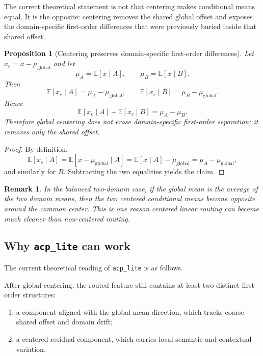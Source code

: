 \documentclass[11pt]{article}
\newtheorem{proposition}{Proposition}
\newtheorem{remark}{Remark}
\begin{document}
The correct theoretical statement is not that centering makes conditional means equal. It is the opposite: centering removes the shared global offset and exposes the domain-specific first-order differences that were previously buried inside that shared offset.

\begin{proposition}[Centering preserves domain-specific first-order differences]
Let $x_c = x - \mu_{\mathrm{global}}$ and let
\[
\mu_A = \mathbb{E}[x\mid A], \qquad \mu_B = \mathbb{E}[x\mid B].
\]
Then
\[
\mathbb{E}[x_c \mid A] = \mu_A - \mu_{\mathrm{global}},
\qquad
\mathbb{E}[x_c \mid B] = \mu_B - \mu_{\mathrm{global}}.
\]
Hence
\[
\mathbb{E}[x_c \mid A] - \mathbb{E}[x_c \mid B] = \mu_A - \mu_B.
\]
Therefore global centering does not erase domain-specific first-order separation; it removes only the shared offset.
\end{proposition}

\begin{proof}
By definition,
\[
\mathbb{E}[x_c \mid A]
=
\mathbb{E}[x-\mu_{\mathrm{global}}\mid A]
=
\mathbb{E}[x\mid A]-\mu_{\mathrm{global}}
=
\mu_A-\mu_{\mathrm{global}},
\]
and similarly for $B$. Subtracting the two equalities yields the claim.
\end{proof}

\begin{remark}
In the balanced two-domain case, if the global mean is the average of the two domain means, then the two centered conditional means become opposite around the common center. This is one reason centered linear routing can become much cleaner than non-centered routing.
\end{remark}

\subsection{Why \texttt{acp\_lite} can work}

The current theoretical reading of \texttt{acp\_lite} is as follows.

After global centering, the routed feature still contains at least two distinct first-order structures:
\begin{enumerate}
    \item a component aligned with the global mean direction, which tracks coarse shared offset and domain drift;
    \item a centered residual component, which carries local semantic and contextual variation.
\end{enumerate}
\end{document}

